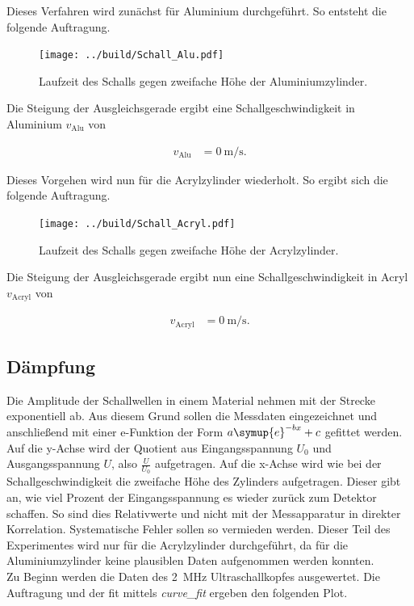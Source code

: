 \noindent Dieses Verfahren wird zunächst für Aluminium durchgeführt. So entsteht die folgende Auftragung.

\begin{figure}[H]
    \centering
    \texttt{[image: ../build/Schall\_Alu.pdf]}
    \caption{Laufzeit des Schalls gegen zweifache Höhe der Aluminiumzylinder.}
\end{figure}

\noindent Die Steigung der Ausgleichsgerade ergibt eine Schallgeschwindigkeit in Aluminium $v_\text{Alu}$ von 

\begin{align*}
    v_\text{Alu} &= \qty{0}{\meter \per \second}.
\end{align*}

\noindent Dieses Vorgehen wird nun für die Acrylzylinder wiederholt. So ergibt sich die folgende Auftragung.

\begin{figure}[H]
    \centering
    \texttt{[image: ../build/Schall\_Acryl.pdf]}
    \caption{Laufzeit des Schalls gegen zweifache Höhe der Acrylzylinder.}
\end{figure}

\noindent Die Steigung der Ausgleichsgerade ergibt nun eine Schallgeschwindigkeit in Acryl $v_\text{Acryl}$ von 

\begin{align*}
    v_\text{Acryl} &= \qty{0}{\meter \per \second}.
\end{align*}


\subsection{Dämpfung}
Die Amplitude der Schallwellen in einem Material nehmen mit der Strecke exponentiell ab. Aus diesem Grund 
sollen die Messdaten eingezeichnet und anschließend mit einer e-Funktion der Form $a \symup{e} ^{-bx} +c$ 
gefittet werden. Auf die y-Achse wird der Quotient aus Eingangsspannung $U_0$ und Ausgangsspannung $U$, 
also $\frac{U}{U_0}$ aufgetragen. Auf die x-Achse wird wie bei der Schallgeschwindigkeit die zweifache Höhe 
des Zylinders aufgetragen. 
Dieser gibt an, wie viel Prozent der Eingangsspannung es wieder zurück zum Detektor schaffen. So sind dies 
Relativwerte und nicht mit der Messapparatur in direkter Korrelation. Systematische Fehler sollen so vermieden 
werden. Dieser Teil des Experimentes wird nur für die Acrylzylinder durchgeführt, da für die Aluminiumzylinder 
keine plausiblen Daten aufgenommen werden konnten. \\
\noindent Zu Beginn werden die Daten des \qty{2}{\mega \hertz} Ultraschallkopfes ausgewertet. Die Auftragung 
und der fit mittels \emph{curve\_fit} ergeben den folgenden Plot.

